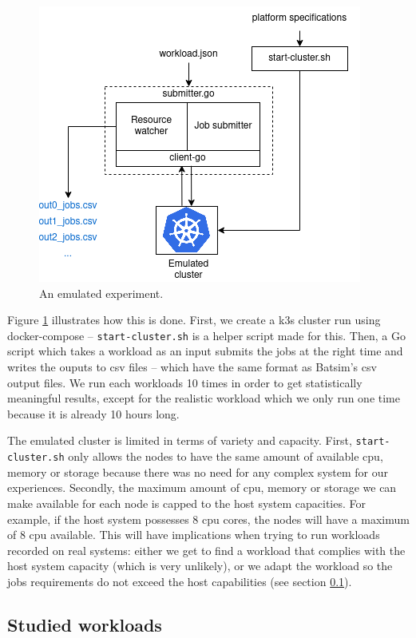 \begin{figure}[H]
	\centering
	\includegraphics[scale=0.7]{./imgs/prot-k3s.png}
	\caption{An emulated experiment.}
	\label{fig:emulated-expe}
\end{figure}

Figure \ref{fig:emulated-expe} illustrates how this is done. First, we create a
k3s cluster run using docker-compose -- \texttt{start-cluster.sh} is a helper
script made for this. Then, a Go script which takes a workload as an input
submits the jobs at the right time and writes the ouputs to csv files -- which
have the same format as Batsim's csv output files. We run each workloads 10
times in order to get statistically meaningful results, except for the
realistic workload which we only run one time because it is already 10 hours
long.

The emulated cluster is limited in terms of variety and capacity. First,
\texttt{start-cluster.sh} only allows the nodes to have the same amount of
available cpu, memory or storage because there was no need for any complex
system for our experiences. Secondly, the maximum amount of cpu, memory or
storage we can make available for each node is capped to the host system
capacities. For example, if the host system possesses 8 cpu cores, the nodes
will have a maximum of 8 cpu available. This will have implications when trying
to run workloads recorded on real systems: either we get to find a workload
that complies with the host system capacity (which is very unlikely), or we
adapt the workload so the jobs requirements do not exceed the host
capabilities (see section \ref{sec:studied-workloads}).

\subsection{Studied workloads} \label{sec:studied-workloads}

